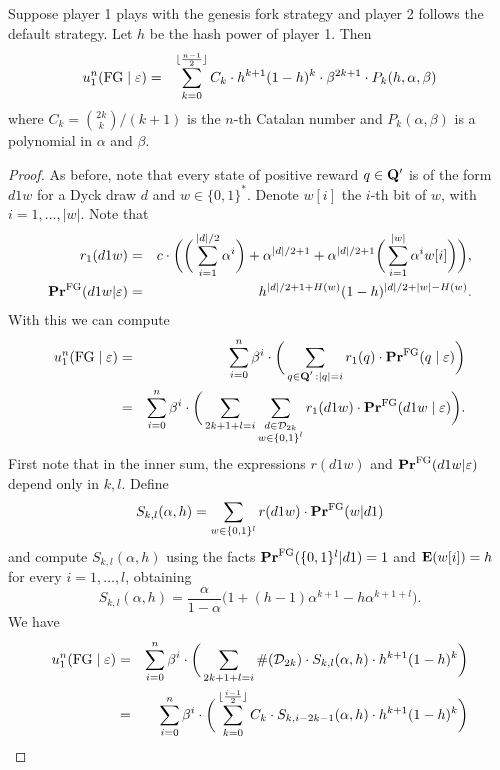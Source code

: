 \begin{myprop}
Suppose player 1 plays with the genesis fork strategy and player 2 follows the default strategy. Let $h$ be the hash power of player 1. Then
\begin{eqnarray*}
	u_1^n(\text{\rm FG} \mid \varepsilon) & = & \sum_{k=0}^{\lfloor\frac{n-1}{2}\rfloor}C_k \cdot h^{k+1}(1-h)^{k}\cdot \beta^{2k+1}\cdot P_k(h,\alpha,\beta)
\end{eqnarray*}
where $C_k={2k\choose k}/(k+1)$ is the $n$-th Catalan number and $P_{k}(\alpha,\beta)$ is a polynomial in $\alpha$ and $\beta$.
\end{myprop}
\begin{proof} As before, note that every state of positive reward $q\in\mathbf{Q}'$ is of the form $d1w$ for a Dyck draw $d$ and $w\in \{0,1\}^\ast$. Denote $w[i]$ the $i$-th bit of $w$, with $i=1,\dots,|w|$. Note that
\begin{eqnarray*}
r_1(d1w) &=& c\cdot \bigg(\bigg(\sum_{i=1}^{|d|/2}\alpha^i \bigg)+\alpha^{|d|/2+1}+\alpha^{|d|/2+1}\bigg(\sum_{i=1}^{|w|}\alpha^i w[i]\bigg)\bigg),\\
\mathbf{Pr}^{\text{\rm FG}}(d1w|\varepsilon) &=& h^{|d|/2+1+H(w)}(1-h)^{|d|/2+|w|-H(w)}.
\end{eqnarray*} 
With this we can compute 
\begin{eqnarray*}
	u_1^n(\text{\rm FG} \mid \varepsilon) & = & \sum_{i=0}^{n}\beta^{i} \cdot  \bigg(\sum_{\substack{q \in \mathbf{Q}' \,: |q| = i}} r_1(q) \cdot 
	\mathbf{Pr}^{\text{\rm FG}}(q \mid \varepsilon)\bigg)\\
								& = &  \sum_{i=0}^{n}\beta^{i} \cdot  \bigg(\sum_{2k+1+l=i}\sum_{\substack{d\in \mathcal{D}_{2k}\\w\in\{0,1\}^l}} r_1(d1w) \cdot 
	\mathbf{Pr}^{\text{\rm FG}}(d1w \mid \varepsilon)\bigg).
\end{eqnarray*}
First note that in the inner sum, the expressions $r(d1w)$ and $\mathbf{Pr}^{\text{\rm FG}}(d1w|\varepsilon)$ depend only in $k,l$. Define
$$S_{k,l}(\alpha,h)=\sum_{w\in\{0,1\}^l}r(d1w)\cdot \mathbf{Pr}^{\text{\rm FG}}(w|d1)$$
and compute $S_{k,l}(\alpha,h)$ using the facts $\mathbf{Pr}^{\text{\rm FG}}(\{0,1\}^l|d1)=1$ and $\mathbf{E}(w[i])=h$ for every $i=1,\dots,l$, obtaining 
$$S_{k,l}(\alpha,h)=\frac{\alpha}{1-\alpha}\bigg(1+(h-1)\alpha^{k+1}-h\alpha^{k+1+l}\bigg).$$
We have
\begin{eqnarray*}
u_1^n(\fg \mid \varepsilon) & = & \sum_{i=0}^{n}\beta^{i} \cdot  \bigg(\sum_{2k+1+l=i} \#(\Dyck_{2k})\cdot S_{k,l}(\alpha,h)\cdot h^{k+1}(1-h)^{k}\bigg)\\
							& = & \sum_{i=0}^{n}\beta^{i} \cdot  \bigg(\sum_{k=0}^{\lfloor\frac{i-1}{2}\rfloor} C_k\cdot S_{k,i-2k-1}(\alpha,h)\cdot h^{k+1}(1-h)^{k}\bigg)

\end{eqnarray*}
\end{proof}
